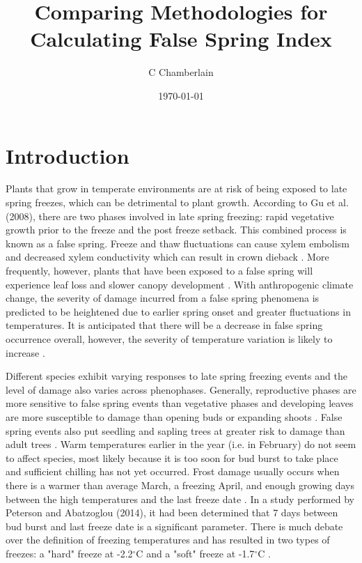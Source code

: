 \documentclass{article}\usepackage[]{graphicx}\usepackage[]{color}
\begin{document}
\title{Comparing Methodologies for Calculating False Spring Index}
\author{C Chamberlain}
\date{\today}
\maketitle 

\renewcommand{\thetable}{\arabic{table}}
\renewcommand{\thefigure}{\arabic{figure}}
\renewcommand{\labelitemi}{$-$}
\section{Introduction}

Plants that grow in temperate environments are at risk of being exposed to late spring freezes, which can be detrimental to plant growth. According to Gu et al. (2008), there are two phases involved in late spring freezing: rapid vegetative growth prior to the freeze and the post freeze setback. This combined process is known as a false spring. Freeze and thaw fluctuations can cause xylem embolism and decreased xylem conductivity which can result in crown dieback \cite{Gu2008}. More frequently, however, plants that have been exposed to a false spring will experience leaf loss and slower canopy development \cite{Hufkens2012}. With anthropogenic climate change, the severity of damage incurred from a false spring phenomena is predicted to be heightened due to earlier spring onset and greater fluctuations in temperatures. It is anticipated that there will be a decrease in false spring occurrence overall, however, the severity of temperature variation is likely to increase \cite{Allstadt2015}. 

Different species exhibit varying responses to late spring freezing events and the level of damage also varies across phenophases. Generally, reproductive phases are more sensitive to false spring events than vegetative phases and developing leaves are more susceptible to damage than opening buds or expanding shoots \cite{Peterson2014}. False spring events also put seedling and sapling trees at greater risk to damage than adult trees \cite{Vitasse2014}. Warm temperatures earlier in the year (i.e. in February) do not seem to affect species, most likely because it is too soon for bud burst to take place and sufficient chilling has not yet occurred. Frost damage usually occurs when there is a warmer than average March, a freezing April, and enough growing days between the high temperatures and the last freeze date \cite{Augspurger2013}. In a study performed by Peterson and Abatzoglou (2014), it had been determined that 7 days between bud burst and last freeze date is a significant parameter. There is much debate over the definition of freezing temperatures and has resulted in two types of freezes: a "hard" freeze at -2.2$^{\circ}$C and a "soft" freeze at -1.7$^{\circ}$C \cite{Augspurger2013, Kodra2011, Vavrus2006}.
\end{document}
